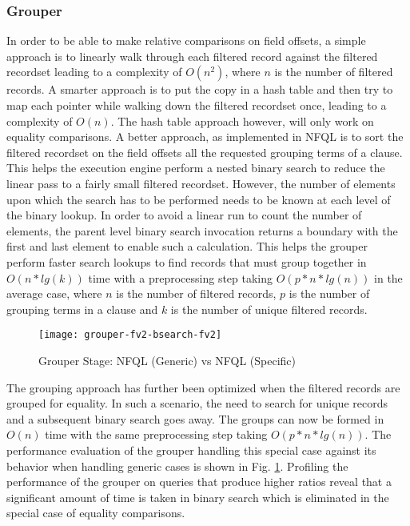 \subsubsection{Grouper}

In order to be able to make relative comparisons on field offsets, a simple
approach is to linearly walk through each filtered record against the filtered
recordset leading to a complexity of $O(n^2)$, where $n$ is the number of
filtered records. A smarter approach is to put the copy in a hash table and
then try to map each pointer while walking down the filtered recordset once,
leading to a complexity of $O(n)$. The hash table approach however, will only
work on equality comparisons. A better approach, as implemented in \ac{NFQL}
is to sort the filtered recordset on the field offsets all the requested
grouping terms of a clause. This helps the execution engine perform a nested
binary search to reduce the linear pass to a fairly small filtered recordset.
However, the number of elements upon which the search has to be performed
needs to be known at each level of the binary lookup. In order to avoid a
linear run to count the number of elements, the parent level binary search
invocation returns a boundary with the first and last element to enable such a
calculation. This helps the grouper perform faster search lookups to find
records that must group together in $O(n*lg(k))$ time with a preprocessing
step taking $O(p*n*lg(n))$ in the average case, where $n$ is the number of
filtered records, $p$ is the number of grouping terms in a clause and $k$ is
the number of unique filtered records.

\begin{figure}[h!]
  \begin{center}
    \texttt{[image: grouper-fv2-bsearch-fv2]}
    \caption{Grouper Stage: NFQL (Generic) vs NFQL (Specific)}
    \label{fig:fv1-fv2-grouper}
  \end{center}
\end{figure}

The grouping approach has further been optimized when the filtered records are
grouped for equality. In such a scenario, the need to search for unique
records and a  subsequent binary search goes away.  The groups can now be
formed in $O(n)$ time with the same preprocessing step taking $O(p*n*lg(n))$.
The performance evaluation of the grouper handling this special case against
its behavior when handling generic cases is shown in Fig.
\ref{fig:fv1-fv2-grouper}. Profiling the performance of the grouper on queries
that produce higher ratios reveal that a significant amount of time is taken
in binary search which is eliminated in the special case of equality
comparisons.

